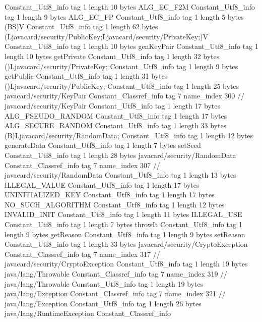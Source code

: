 {{{		}
		Constant_Utf8_info {
			tag	1
			length	10
			bytes	ALG_EC_F2M
		}
		Constant_Utf8_info {
			tag	1
			length	9
			bytes	ALG_EC_FP
		}
		Constant_Utf8_info {
			tag	1
			length	5
			bytes	(BS)V
		}
		Constant_Utf8_info {
			tag	1
			length	62
			bytes	(Ljavacard/security/PublicKey;Ljavacard/security/PrivateKey;)V
		}
		Constant_Utf8_info {
			tag	1
			length	10
			bytes	genKeyPair
		}
		Constant_Utf8_info {
			tag	1
			length	10
			bytes	getPrivate
		}
		Constant_Utf8_info {
			tag	1
			length	32
			bytes	()Ljavacard/security/PrivateKey;
		}
		Constant_Utf8_info {
			tag	1
			length	9
			bytes	getPublic
		}
		Constant_Utf8_info {
			tag	1
			length	31
			bytes	()Ljavacard/security/PublicKey;
		}
		Constant_Utf8_info {
			tag	1
			length	25
			bytes	javacard/security/KeyPair
		}
		Constant_Classref_info {
			tag	7
			name_index	300		// javacard/security/KeyPair
		}
		Constant_Utf8_info {
			tag	1
			length	17
			bytes	ALG_PSEUDO_RANDOM
		}
		Constant_Utf8_info {
			tag	1
			length	17
			bytes	ALG_SECURE_RANDOM
		}
		Constant_Utf8_info {
			tag	1
			length	33
			bytes	(B)Ljavacard/security/RandomData;
		}
		Constant_Utf8_info {
			tag	1
			length	12
			bytes	generateData
		}
		Constant_Utf8_info {
			tag	1
			length	7
			bytes	setSeed
		}
		Constant_Utf8_info {
			tag	1
			length	28
			bytes	javacard/security/RandomData
		}
		Constant_Classref_info {
			tag	7
			name_index	307		// javacard/security/RandomData
		}
		Constant_Utf8_info {
			tag	1
			length	13
			bytes	ILLEGAL_VALUE
		}
		Constant_Utf8_info {
			tag	1
			length	17
			bytes	UNINITIALIZED_KEY
		}
		Constant_Utf8_info {
			tag	1
			length	17
			bytes	NO_SUCH_ALGORITHM
		}
		Constant_Utf8_info {
			tag	1
			length	12
			bytes	INVALID_INIT
		}
		Constant_Utf8_info {
			tag	1
			length	11
			bytes	ILLEGAL_USE
		}
		Constant_Utf8_info {
			tag	1
			length	7
			bytes	throwIt
		}
		Constant_Utf8_info {
			tag	1
			length	9
			bytes	getReason
		}
		Constant_Utf8_info {
			tag	1
			length	9
			bytes	setReason
		}
		Constant_Utf8_info {
			tag	1
			length	33
			bytes	javacard/security/CryptoException
		}
		Constant_Classref_info {
			tag	7
			name_index	317		// javacard/security/CryptoException
		}
		Constant_Utf8_info {
			tag	1
			length	19
			bytes	java/lang/Throwable
		}
		Constant_Classref_info {
			tag	7
			name_index	319		// java/lang/Throwable
		}
		Constant_Utf8_info {
			tag	1
			length	19
			bytes	java/lang/Exception
		}
		Constant_Classref_info {
			tag	7
			name_index	321		// java/lang/Exception
		}
		Constant_Utf8_info {
			tag	1
			length	26
			bytes	java/lang/RuntimeException
		}
		Constant_Classref_info {
}}}
